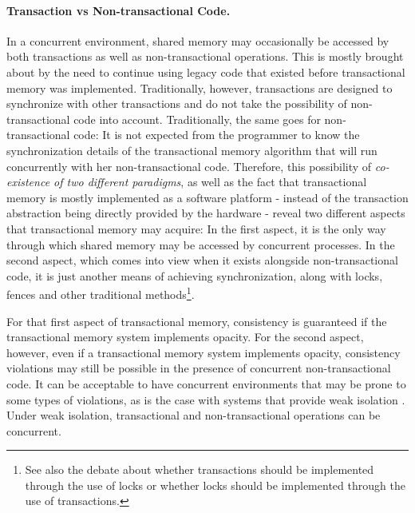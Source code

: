 \documentclass[runningheads,a4paper]{llncs}
\begin{document}
\paragraph{Transaction vs Non-transactional Code.}
In a  concurrent environment,  shared memory  may  occasionally be
accessed by both transactions as well as  
non-transactional operations. This  is mostly brought about by  the need to
continue using legacy code that existed before  
transactional memory was  implemented. Traditionally, however, transactions
are designed to synchronize with other transactions  
and do  not take  the possibility of  non-transactional code  into account.
Traditionally, the same goes for non-transactional code: It  
is not expected from the  programmer to know the synchronization details of
the transactional memory algorithm that will run  
concurrently with  her non-transactional code.  Therefore, this possibility
of {\it co-existence of two different paradigms}, as well as  
the  fact that  transactional memory  is mostly  implemented as  a software
platform - instead of the transaction abstraction being  
directly  provided by  the hardware  -  reveal  two different  aspects that
transactional memory may acquire: In the first aspect,  
it  is  the  only way  through  which  shared  memory  may be  accessed  by
concurrent processes.  In the second aspect, which  
comes into view when it exists alongside non-transactional code, it is just
another means of achieving synchronization,  
along with  locks, fences  and other traditional 
 methods\footnote{See also the debate about whether transactions should be  
implemented through the use of locks or whether locks should be implemented
through the use of transactions.}.  

For that first aspect of transactional memory, consistency is guaranteed if
the transactional memory system implements  
opacity. For the  second aspect, however, even if  a transactional memory
system implements opacity, consistency violations  
may  still be  possible  in the  presence  of concurrent  non-transactional
code. It can be acceptable to have concurrent environments  
that may be prone to some types  of violations, as is the case with systems
that provide weak isolation \cite{blundell06} \cite{shpeis07}.  
Under weak isolation, transactional and non-transactional operations can be
concurrent. 
\end{document}
